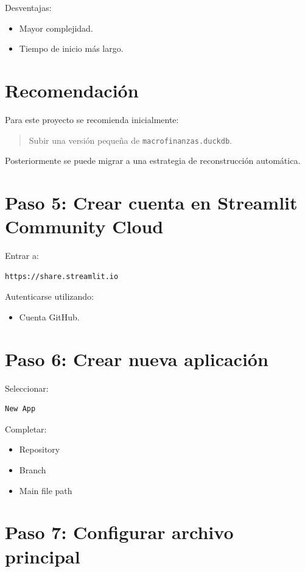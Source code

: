 Desventajas:

\begin{itemize}
\item Mayor complejidad.
\item Tiempo de inicio más largo.
\end{itemize}

\section{Recomendación}

Para este proyecto se recomienda inicialmente:

\begin{quote}
Subir una versión pequeña de \texttt{macrofinanzas.duckdb}.
\end{quote}

Posteriormente se puede migrar a una estrategia de reconstrucción automática.

\section{Paso 5: Crear cuenta en Streamlit Community Cloud}

Entrar a:

\begin{verbatim}
https://share.streamlit.io
\end{verbatim}

Autenticarse utilizando:

\begin{itemize}
\item Cuenta GitHub.
\end{itemize}

\section{Paso 6: Crear nueva aplicación}

Seleccionar:

\begin{verbatim}
New App
\end{verbatim}

Completar:

\begin{itemize}
\item Repository
\item Branch
\item Main file path
\end{itemize}

\section{Paso 7: Configurar archivo principal}


